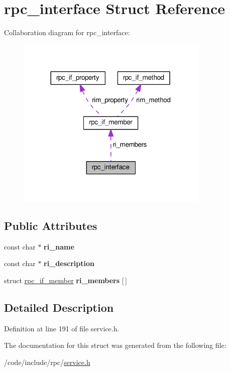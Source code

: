 \hypertarget{structrpc__interface}{}\section{rpc\+\_\+interface Struct Reference}
\label{structrpc__interface}


Collaboration diagram for rpc\+\_\+interface\+:
\nopagebreak
\begin{figure}[H]
\begin{center}
\leavevmode
\includegraphics[width=260pt]{structrpc__interface__coll__graph}
\end{center}
\end{figure}
\subsection*{Public Attributes}
\begin{DoxyCompactItemize}
\item 
const char $\ast$ {\bfseries ri\+\_\+name}\hypertarget{structrpc__interface_a7e1b33ccc8a32e6daaf69ec6daec7bc1}{}\label{structrpc__interface_a7e1b33ccc8a32e6daaf69ec6daec7bc1}

\item 
const char $\ast$ {\bfseries ri\+\_\+description}\hypertarget{structrpc__interface_a851f0bfb495af801a2958fef34596e6a}{}\label{structrpc__interface_a851f0bfb495af801a2958fef34596e6a}

\item 
struct \hyperlink{structrpc__if__member}{rpc\+\_\+if\+\_\+member} {\bfseries ri\+\_\+members} \mbox{[}$\,$\mbox{]}\hypertarget{structrpc__interface_af28bb2a8e330bb25c2c7e681cd2f7356}{}\label{structrpc__interface_af28bb2a8e330bb25c2c7e681cd2f7356}

\end{DoxyCompactItemize}


\subsection{Detailed Description}


Definition at line 191 of file service.\+h.



The documentation for this struct was generated from the following file\+:\begin{DoxyCompactItemize}
\item 
/code/include/rpc/\hyperlink{service_8h}{service.\+h}\end{DoxyCompactItemize}
